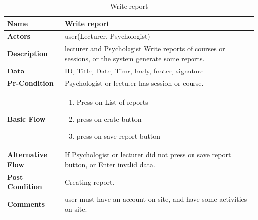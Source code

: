 \documentclass[../Psychological_system_web_application.tex]{subfiles}
\begin{document}
	\begin{center}
		\begin{table}[h!]
			\begin{tabular}{ | m{4cm} | m{10cm}| } 
				\hline
			 	\textbf{\large Name}& Write report\\ 
				\hline
			  	\textbf{\large Actors}& user(Lecturer, Psychologist)\\ 
				\hline
			  	\textbf{\large Description}& lecturer and Psychologist Write reports of courses or sessions, or the system generate some reports.\\ 
				\hline
				\textbf{\large Data}& ID, Title, Date, Time, body, footer, signature.\\ 
				\hline
				 \textbf{\large Pr-Condition}& Psychologist or lecturer has session or course. \\ 
				\hline
				\textbf{\large Basic Flow}&\begin{enumerate}
				\item
					Press on List of reports
				\item
					press on crate button
				\item 
					press on save report button \end{enumerate}\\
					\hline
				\textbf{\large Alternative Flow}& If Psychologist or lecturer did not press on save report button, or Enter invalid data.\\ 
				\hline
				\textbf{\large Post Condition}& Creating report.\\ 
				\hline
				\textbf{\large Comments}& user must have an account on site, and have some activities on site.\\ 
				\hline
			\end{tabular}
			\caption{Write report}
			\label{table:WRITE-REPORT}
		\end{table}
	\end{center}
	
\end{document}

